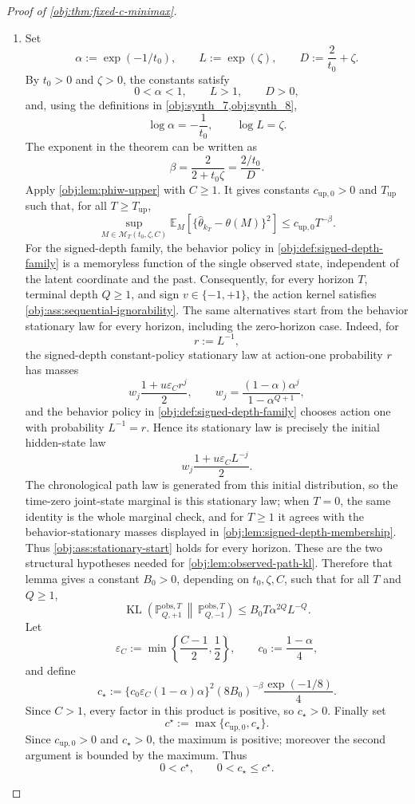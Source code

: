 \documentclass[11pt]{article}
\begin{document}
\begin{proof}[Proof of \cref{obj:thm:fixed-c-minimax}]
\begin{enumerate}
\item Set
\[
\alpha:=\exp(-1/t_0),
\qquad
L:=\exp(\zeta),
\qquad
D:=\frac{2}{t_0}+\zeta .
\]
By \(t_0>0\) and \(\zeta>0\), the constants satisfy
\[
0<\alpha<1,\qquad L>1,\qquad D>0,
\]
and, using the definitions in \cref{obj:synth_7,obj:synth_8},
\[
\log\alpha=-\frac1{t_0},
\qquad
\log L=\zeta .
\]
The exponent in the theorem can be written as
\[
\beta=\frac{2}{2+t_0\zeta}
      =\frac{2/t_0}{D}.
\]
Apply \cref{obj:lem:phiw-upper} with \(C\ge1\). It gives constants
\(c_{\mathrm{up},0}>0\) and \(T_{\mathrm{up}}\) such that, for all
\(T\ge T_{\mathrm{up}}\),
\[
\sup_{M\in\mathcal M_T(t_0,\zeta,C)}
\mathbb E_M\!\left[
\{\widehat\theta_{k_T}-\theta(M)\}^2
\right]
\le
c_{\mathrm{up},0}T^{-\beta}.
\]
For the signed-depth family, the behavior policy in \cref{obj:def:signed-depth-family} is a memoryless function of the single observed state, independent of the latent coordinate and the past. Consequently, for every horizon \(T\), terminal depth \(Q\ge1\), and sign \(v\in\{-1,+1\}\), the action kernel satisfies \cref{obj:ass:sequential-ignorability}. The same alternatives start from the behavior stationary law for every horizon, including the zero-horizon case. Indeed, for
\[
r:=L^{-1},
\]
the signed-depth constant-policy stationary law at action-one probability \(r\) has masses
\[
w_j\frac{1+u\varepsilon_C r^j}{2},
\qquad
w_j=\frac{(1-\alpha)\alpha^j}{1-\alpha^{Q+1}},
\]
and the behavior policy in \cref{obj:def:signed-depth-family} chooses action one with probability \(L^{-1}=r\). Hence its stationary law is precisely the initial hidden-state law
\[
w_j\frac{1+u\varepsilon_C L^{-j}}{2}.
\]
The chronological path law is generated from this initial distribution, so the time-zero joint-state marginal is this stationary law; when \(T=0\), the same identity is the whole marginal check, and for \(T\ge1\) it agrees with the behavior-stationary masses displayed in \cref{obj:lem:signed-depth-membership}. Thus \cref{obj:ass:stationary-start} holds for every horizon. These are the two structural hypotheses needed for \cref{obj:lem:observed-path-kl}. Therefore that lemma gives a constant \(B_0>0\), depending on \(t_0,\zeta,C\), such that for all \(T\) and \(Q\ge1\),
\[
\operatorname{KL}\!\left(
\mathbb P_{Q,+1}^{\mathrm{obs},T}
\,\middle\|\,
\mathbb P_{Q,-1}^{\mathrm{obs},T}
\right)
\le
B_0T\alpha^{2Q}L^{-Q}.
\]
Let
\[
\varepsilon_C:=\min\left\{\frac{C-1}{2},\frac12\right\},
\qquad
c_0:=\frac{1-\alpha}{4},
\]
and define
\[
c_\star:=
\{c_0\varepsilon_C(1-\alpha)\alpha\}^2
(8B_0)^{-\beta}\frac{\exp(-1/8)}{4}.
\]
Since \(C>1\), every factor in this product is positive, so \(c_\star>0\). Finally set
\[
c^\star:=\max\{c_{\mathrm{up},0},c_\star\}.
\]
Since \(c_{\mathrm{up},0}>0\) and \(c_\star>0\), the maximum is positive; moreover the second argument is bounded by the maximum. Thus
\[
0<c^\star,
\qquad
0<c_\star\le c^\star .
\] %


\end{enumerate}
\end{proof}
\end{document}
